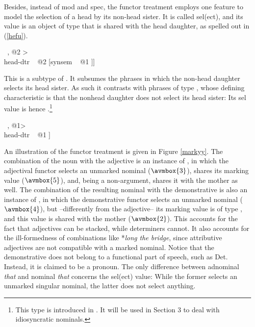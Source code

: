 \documentclass[output=paper]{langsci/langscibook}
\begin{document}
\noindent
Besides, instead of {\sc mod} and {\sc spec}, the functor treatment employs 
one feature to model the selection of a head by its non-head sister. It is   
called {\sc sel(ect)}, and its value is an object of type  that is 
shared with the head daughter, as spelled out in (\ref{hefu}).  

\begin{exe}
\ex\label{hefu} 
\begin{avm}
[\type{head-functor-phr}                     \\
 dtrs ~ <[synsem|loc|cat|head|sel ~ @1]~, @2 > \\
 head-dtr ~ @2 [synsem ~ @1 ]]
\end{avm}
\end{exe} 

\noindent
This is a subtype of . It subsumes 
the phrases in which the non-head daughter selects its head sister.
As such it contrasts with phrases of type  
, whose defining characteristic is 
that the nonhead daughter does not select its head sister: Its {\sc sel} value 
is hence .\footnote{This type is introduced in 
\citet[130]{VanEynde98a}. It will be used in Section 3 to deal with 
idiosyncratic nominals.}   

\begin{exe}
\ex\label{hein} 
\begin{avm}
[\type{head-independent-phr}                           \\
 dtrs ~ <[synsem|loc|cat|head|sel ~ \type{none}]~, @1> \\
 head-dtr ~ @1 ]
\end{avm}
\end{exe}    

An illustration of the functor treatment is given in Figure \ref{markyy}. 
The combination of the noun with the adjective is an instance of , 
in which the adjectival functor selects an unmarked nominal ($\avmbox{3}$),  
shares its {\sc marking} value ($\avmbox{5}$), and, being a non-argument, 
shares it with the mother as well. 
The combination of the resulting nominal with the demonstrative is also 
an instance of ,
in which the demonstrative functor selects an unmarked nominal ($\avmbox{4}$), 
but --differently from the adjective-- its {\sc marking} value is of type 
, and this value is shared with the mother ($\avmbox{2}$).    
This accounts for the fact that adjectives can be stacked, while  
determiners cannot. It also accounts for the ill-formedness of combinations like 
*\emph{long the bridge}, since attributive adjectives are not compatible with a
marked nominal.  
Notice that the demonstrative does not belong to a functional part of speech, such as Det.
Instead, it is claimed to be a pronoun. The only difference between adnominal \emph{that} and nominal
\emph{that} concerns the {\sc sel(ect)} value: While the former selects an unmarked singular nominal, 
the latter does not select anything.      
\end{document}
